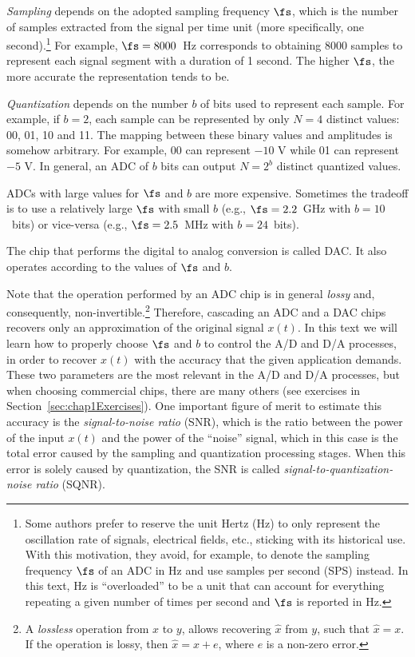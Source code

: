 \emph{Sampling} depends on the adopted sampling frequency $\fs$, which is the number of samples extracted from the signal per time unit (more specifically, one second).\footnote{Some authors prefer to reserve the unit Hertz (Hz) to only represent the oscillation rate of signals, electrical fields, etc., sticking with its historical use. With this motivation, they avoid, for example, to denote the sampling frequency $\fs$ of an ADC in Hz and use samples per second (SPS) instead. In this text, Hz is ``overloaded'' to be a unit that can account for everything repeating a given number of times per second and $\fs$ is reported in Hz.} For example, $\fs = 8000$~Hz corresponds to obtaining 8000 samples to represent each signal segment with a duration of 1 second. The higher $\fs$, the more accurate the representation tends to be.

\emph{Quantization} depends on the number $b$ of bits used to represent each sample. For example, if $b=2$, each sample can be represented by only $N=4$ distinct values:
00, 01, 10 and 11. The mapping between these binary values and amplitudes is somehow arbitrary. For example, 00 can represent $-10$ V while 01 can represent $-5$ V. In general, an ADC of $b$ bits can output $N=2^b$ distinct quantized values.

ADCs with large values for $\fs$ and $b$ are more expensive. Sometimes the tradeoff is to use a relatively large $\fs$ with small $b$ (e.g., $\fs=2.2$~GHz with $b=10$~bits) or vice-versa (e.g., $\fs=2.5$~MHz with $b=24$~bits).

The chip that performs the digital to analog conversion is called DAC. It also operates according to the values of $\fs$ and $b$.

Note that the operation performed by an ADC chip is in general \emph{lossy} and, consequently, non-invertible.\footnote{A \emph{lossless} operation from $x$ to $y$, allows recovering $\hat x$ from $y$, such that $\hat x=x$. If the operation is lossy, then $\hat x = x + e$, where $e$ is a non-zero error.} Therefore, cascading an ADC and a DAC chips recovers only an approximation of the original signal $x(t)$. In this text we will learn how to properly choose $\fs$ and $b$ to control the A/D and D/A processes, in order to recover $x(t)$ with the accuracy that the given application demands. These two parameters are the most relevant in the A/D and D/A processes, but when choosing commercial chips, there are many others (see exercises in Section~\ref{sec:chap1Exercises}). One important figure of merit to estimate this accuracy is the \emph{signal-to-noise ratio} (SNR), which is the ratio between the power of the input $x(t)$ and the power of the ``noise'' signal, which in this case is the total error caused by the sampling and quantization processing stages. When this error is solely caused by quantization, the SNR is called \emph{signal-to-quantization-noise ratio} (SQNR).

